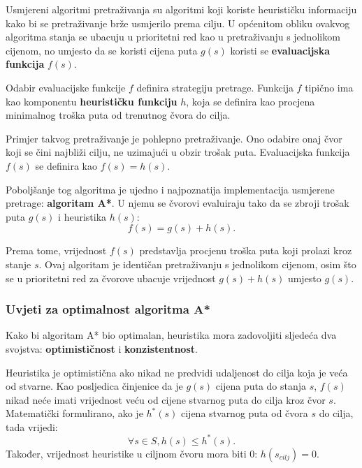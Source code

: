 \documentclass[times, utf8, zavrsni, numeric]{fer}
\begin{document}
\par Usmjereni algoritmi pretraživanja su algoritmi koji koriste heurističku informaciju kako bi se pretraživanje brže usmjerilo prema cilju.
U općenitom obliku ovakvog algoritma stanja se ubacuju u prioritetni red kao u pretraživanju s jednolikom cijenom, no umjesto da se koristi cijena puta \(g(s)\) koristi se \textbf{evaluacijska funkcija} \(f(s)\).

\par Odabir evaluacijske funkcije \(f\) definira strategiju pretrage. 
Funkcija \(f\) tipično ima kao komponentu \textbf{heurističku funkciju} \(h\), koja se definira kao procjena minimalnog troška puta od trenutnog čvora do cilja\cite{book:AIModernApproach}.

\par Primjer takvog pretraživanje je pohlepno pretraživanje. 
Ono odabire onaj čvor koji se čini najbliži cilju, ne uzimajući u obzir trošak puta.
Evaluacijska funkcija \(f(s)\) se definira kao \(f(s) = h(s)\).

\par Poboljšanje tog algoritma je ujedno i najpoznatija implementacija usmjerene pretrage: \textbf{algoritam A*}. 
U njemu se čvorovi evaluiraju tako da se zbroji trošak puta \(g(s)\) i heuristika \(h(s)\):
\begin{equation}
f(s) = g(s) + h(s).
\end{equation} 

\par Prema tome, vrijednost \(f(s)\) predstavlja procjenu troška puta koji prolazi kroz stanje \(s\).
Ovaj algoritam je identičan pretraživanju s jednolikom cijenom, osim što se u prioritetni red za čvorove ubacuje vrijednost \(g(s) + h(s)\) umjesto \(g(s)\).

\subsubsection{Uvjeti za optimalnost algoritma A*}

\par Kako bi algoritam A* bio optimalan, heuristika mora zadovoljiti sljedeća dva svojstva: \textbf{optimističnost} i \textbf{konzistentnost}.

\par Heuristika je optimistična ako nikad ne predvidi udaljenost do cilja koja je veća od stvarne. 
Kao posljedica činjenice da je \(g(s)\) cijena puta do stanja \(s\), \(f(s)\) nikad neće imati vrijednost veću od cijene stvarnog puta do cilja kroz čvor \(s\).
Matematički formulirano, ako je \(h^*(s)\) cijena stvarnog puta od čvora \(s\) do cilja, tada vrijedi:
\begin{equation}
\forall s \in S, h(s) \leq h^*(s).
\end{equation} 
Također, vrijednost heuristike u ciljnom čvoru mora biti 0: \(h(s_{cilj}) = 0\).
\end{document}
